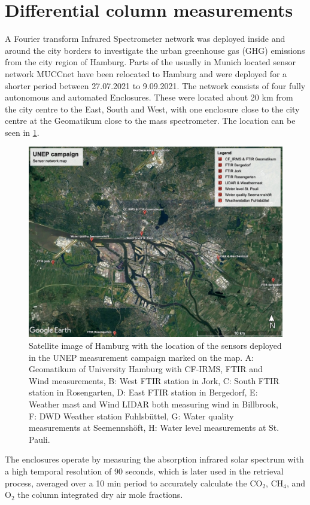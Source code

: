 \section{Differential column measurements}
A Fourier transform Infrared Spectrometer network was deployed inside and around the city borders to investigate the urban greenhouse gas (GHG) emissions from the city region of Hamburg. Parts of the usually in Munich located sensor network MUCCnet have been relocated to Hamburg and were deployed for a shorter period between 27.07.2021 to 9.09.2021. The network consists of four fully autonomous and automated Enclosures. These were located about 20 km from the city centre to the East, South and West, with one enclosure close to the city centre at the Geomatikum close to the mass spectrometer. The location can be seen in \cref{UNEPmap}.
\begin{figure}[htbp]
 \centering
 \includegraphics[width=1\textwidth]{figures/Appendix/Map/UNEP_map.jpg}
 \caption[UNEP Map of sensor network]{Satellite image of Hamburg with the location of the sensors deployed in the UNEP measurement campaign marked on the map. A: Geomatikum of University Hamburg with CF-IRMS, FTIR and Wind measurements, B: West FTIR station in Jork, C: South FTIR station in Rosengarten, D: East FTIR station in Bergedorf, E: Weather mast and Wind LIDAR both measuring wind in Billbrook, F: DWD Weather station Fuhlsbüttel, G: Water quality measurements at Seemennshöft, H: Water level measurements at St. Pauli. \cite{GoogleLLC.2023}}
 \label{UNEPmap}
\end{figure}
The enclosures operate by measuring the absorption infrared solar spectrum with a high temporal resolution of 90 seconds, which is later used in the retrieval process, averaged over a 10 min period to accurately calculate the CO$_2$, CH$_4$, and O$_2$ the column integrated dry air mole fractions. \\
